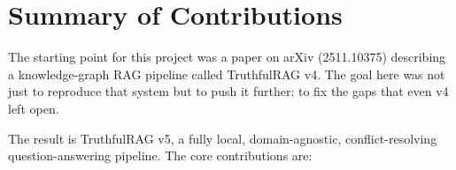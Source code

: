 

\section{Summary of Contributions}

The starting point for this project was a paper on arXiv (2511.10375) describing
a knowledge-graph RAG pipeline called TruthfulRAG v4. The goal here was
not just to reproduce that system but to push it further: to fix the gaps that
even v4 left open.

The result is TruthfulRAG v5, a fully local, domain-agnostic, conflict-resolving
question-answering pipeline. The core contributions are:

